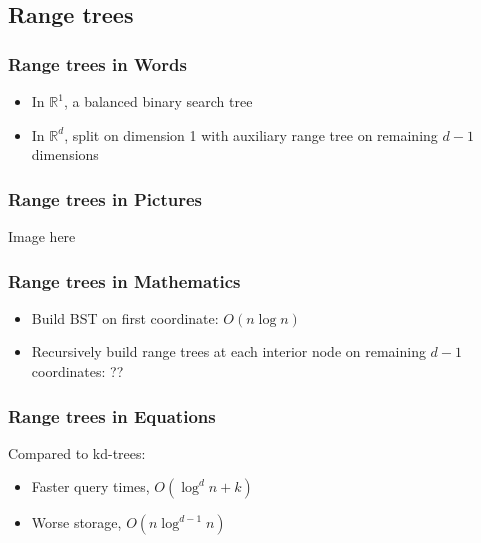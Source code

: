 \documentclass{beamer}
\begin{document}
\subsection{Range trees}

\begin{frame}
  \frametitle{Range trees in Words}
  \begin{itemize}
  \item<1-> In $\mathbb{R}^1$, a balanced binary search tree
  \item<2> In $\mathbb{R}^d$, split on dimension 1 with auxiliary
    range tree on remaining $d-1$ dimensions
  \end{itemize}
\end{frame}

\begin{frame}
  \frametitle{Range trees in Pictures}

  {\huge Image here}
\end{frame}

\begin{frame}
  \frametitle{Range trees in Mathematics}

  \begin{itemize}
  \item Build BST on first coordinate: $O(n\log n)$
  \item Recursively build range trees at each interior node on
    remaining $d-1$ coordinates: ??
  \end{itemize}
\end{frame}

\begin{frame}
  \frametitle{Range trees in Equations}
  Compared to kd-trees:
  \begin{itemize}
  \item Faster query times, $O(\log^d n + k)$
  \item Worse storage, $O(n \log^{d-1} n)$
  \end{itemize}
\end{frame}
\end{document}
